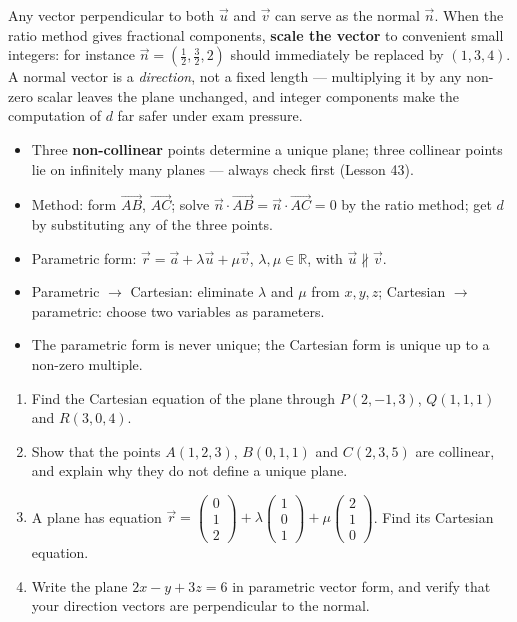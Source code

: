 \documentclass[11pt]{article}
\begin{document}
\begin{savaistu}
Any vector perpendicular to both $\vec{u}$ and $\vec{v}$ can serve as the normal $\vec{n}$. When the ratio method gives fractional components, \textbf{scale the vector} to convenient small integers: for instance $\vec{n}=\left(\tfrac{1}{2},\tfrac{3}{2},2\right)$ should immediately be replaced by $(1,3,4)$. A normal vector is a \emph{direction}, not a fixed length --- multiplying it by any non-zero scalar leaves the plane unchanged, and integer components make the computation of $d$ far safer under exam pressure.
\end{savaistu}

\begin{aretenir}
\begin{itemize}
\item Three \textbf{non-collinear} points determine a unique plane; three collinear points lie on infinitely many planes --- always check first (Lesson 43).
\item Method: form $\vec{AB}$, $\vec{AC}$; solve $\vec{n}\cdot\vec{AB}=\vec{n}\cdot\vec{AC}=0$ by the ratio method; get $d$ by substituting any of the three points.
\item Parametric form: $\vec{r}=\vec{a}+\lambda\vec{u}+\mu\vec{v}$, $\lambda,\mu\in\mathbb{R}$, with $\vec{u}\nparallel\vec{v}$.
\item Parametric $\to$ Cartesian: eliminate $\lambda$ and $\mu$ from $x,y,z$; Cartesian $\to$ parametric: choose two variables as parameters.
\item The parametric form is never unique; the Cartesian form is unique up to a non-zero multiple.
\end{itemize}
\end{aretenir}

\begin{exercice}[Practice]
\begin{enumerate}
\item Find the Cartesian equation of the plane through $P(2,-1,3)$, $Q(1,1,1)$ and $R(3,0,4)$.
\item Show that the points $A(1,2,3)$, $B(0,1,1)$ and $C(2,3,5)$ are collinear, and explain why they do not define a unique plane.
\item A plane has equation $\vec{r}=\begin{pmatrix} 0 \\ 1 \\ 2 \end{pmatrix}+\lambda\begin{pmatrix} 1 \\ 0 \\ 1 \end{pmatrix}+\mu\begin{pmatrix} 2 \\ 1 \\ 0 \end{pmatrix}$. Find its Cartesian equation.
\item Write the plane $2x-y+3z=6$ in parametric vector form, and verify that your direction vectors are perpendicular to the normal.
\end{enumerate}
\end{exercice}
\end{document}
